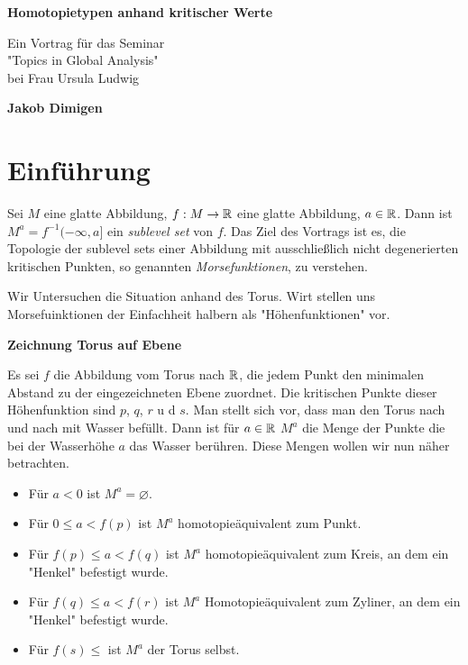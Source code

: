 \documentclass[a4paper,11pt]{article}
\begin{document}
\begin{titlepage}
    \begin{center}
        \vspace*{1cm}
 
        \Large{\textbf{Homotopietypen anhand kritischer Werte}}
 
        \vspace{0.5cm}
        Ein Vortrag für das Seminar \\ 
        "Topics in Global Analysis" \\
        bei Frau Ursula Ludwig
             
        \vspace{1.5cm}
 
        \textbf{Jakob Dimigen}
             
    \end{center}
 \end{titlepage}
 

\section{Einführung}

Sei $M$ eine glatte Abbildung, $f: M \to {\mathbb R}$ eine glatte Abbildung, 
$a \in {\mathbb R}$. Dann ist $M^a = f^{-1}(- \infty, a]$ ein \textit{sublevel set} von 
$f$. Das Ziel des Vortrags ist es, die Topologie der sublevel sets einer 
Abbildung mit ausschließlich nicht degenerierten kritischen Punkten, so genannten
\textit{Morsefunktionen}, zu verstehen.

Wir Untersuchen die Situation anhand des Torus. Wirt stellen uns Morsefuinktionen
der Einfachheit halbern als "Höhenfunktionen" vor.

\textbf{Zeichnung Torus auf Ebene}

Es sei $f$ die Abbildung vom Torus nach ${\mathbb R}$, die jedem Punkt den minimalen
Abstand zu der eingezeichneten Ebene zuordnet. 
Die kritischen Punkte dieser Höhenfunktion sind $p$, $q$, $r$ u d $s$.
Man stellt sich vor, dass man den Torus nach und nach mit Wasser befüllt. Dann 
ist für $a \in {\mathbb R}$ $M^a$ die Menge der Punkte die bei der Wasserhöhe $a$ das 
Wasser berühren. Diese Mengen wollen wir nun näher betrachten. 

\begin{itemize}
    \item Für $a < 0$ ist $M^a = \varnothing$.
    \item Für $0 \leq a < f(p)$ ist $M^a$ homotopieäquivalent zum Punkt.
    \item Für $f(p) \leq a < f(q)$ ist $M^a$ homotopieäquivalent zum Kreis,
        an dem ein "Henkel" befestigt wurde.
    \item Für $f(q) \leq a < f(r)$ ist $M^a$ Homotopieäquivalent zum Zyliner,
        an dem ein "Henkel" befestigt wurde.
    \item Für $f(s) \leq$ ist $M^a$ der Torus selbst.
\end{itemize}
\end{document}
